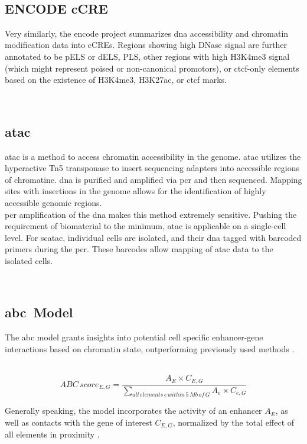     \subsection{ENCODE \acs{cCRE}}
    Very similarly, the \ac{encode} project summarizes \ac{dna} accessibility and chromatin modification data into \acfp{cCRE}. Regions showing high DNase signal are further annotated to be \ac{pELS} or \ac{dELS}, \ac{PLS}, other regions with high \ac{H3K4me3} signal (which might represent poised or non-canonical promotors), or \ac{ctcf}-only elements based on the existence of \ac{H3K4me3}, \ac{H3K27ac}, or \ac{ctcf} marks.
    \cite{mooreExpandedEncyclopaediasDNA2020}

    \subsection{\acs{atac}}
    \Acf{atac} is a method to access chromatin accessibility in the genome. \Ac{atac} utilizes the hyperactive Tn5 transponase to insert sequencing adapters into accessible regions of chromatine. \ac{dna} is purified and amplified via \ac{pcr} and then sequenced. Mapping sites with insertions in the genome allows for the identification of highly accessible genomic regions. \cite{buenrostroTranspositionNativeChromatin2013, buenrostroATACseqMethodAssaying2015}\\
    \ac{pcr} amplification of the \ac{dna} makes this method extremely sensitive. Pushing the requirement of biomaterial to the minimum, \ac{atac} is applicable on a single-cell level. For sc\ac{atac}, individual cells are isolated, and their \ac{dna} tagged with barcoded primers during the \ac{pcr}. These barcodes allow mapping of \ac{atac} data to the isolated cells. \cite{buenrostroSinglecellChromatinAccessibility2015}

    \subsection{\acs{abc} Model}
    The \acf{abc} model grants insights into potential cell specific enhancer-gene interactions based on chromatin state, outperforming previously used methods \cite{fulcoActivitybycontactModelEnhancer2019a, nasserGenomewideEnhancerMaps2021a}.

        $$ ABC\,score_{E, G} = \frac{A_E \times C_{E,G}}{\sum\limits_{all\,elements\,e\,within\,5\,Mb\,of\,G} A_e \times C_{e, G}} $$

    Generally speaking, the model incorporates the activity of an enhancer $A_E$, as well as contacts with the gene of interest $C_{E,G}$, normalized by the total effect of all elements in proximity \cite{fulcoActivitybycontactModelEnhancer2019a, nasserGenomewideEnhancerMaps2021a}.

